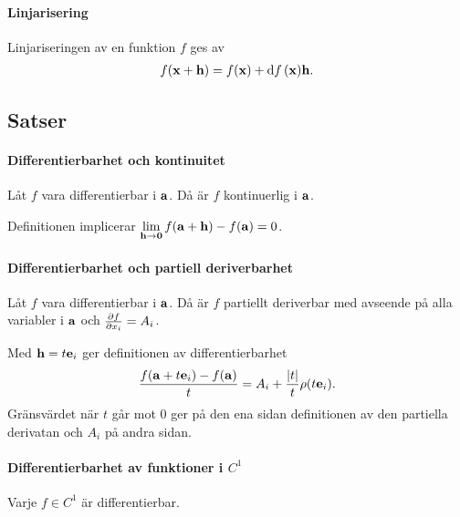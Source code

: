 \paragraph{Linjarisering}
Linjariseringen av en funktion $f$ ges av
\begin{align*}
	f(\vect{x} + \vect{h}) = f(\vect{x}) + \dd{f} (\vect{x})\vect{h}.
\end{align*}

\subsection{Satser}

\paragraph{Differentierbarhet och kontinuitet}
Låt $f$ vara differentierbar i $\vect{a}$. Då är $f$ kontinuerlig i $\vect{a}$.

\proof
Definitionen implicerar $\limit{\vect{h}}{\vect{0}}f(\vect{a} + \vect{h}) - f(\vect{a}) = 0$.

\paragraph{Differentierbarhet och partiell deriverbarhet}
Låt $f$ vara differentierbar i $\vect{a}$. Då är $f$ partiellt deriverbar med avseende på alla variabler i $\vect{a}$ och $\pdv{f}{x_i}(\vect{a}) = A_i$.

\proof
Med $\vect{h} = t\vect{e}_i$ ger definitionen av differentierbarhet
\begin{align*}
	\frac{f(\vect{a} + t\vect{e}_i) - f(\vect{a})}{t} = A_i + \frac{\abs{t}}{t}\rho(t\vect{e}_i).
\end{align*}
Gränsvärdet när $t$ går mot $0$ ger på den ena sidan definitionen av den partiella derivatan och $A_i$ på andra sidan.

\paragraph{Differentierbarhet av funktioner i $C^1$}
Varje $f\in C^1$ är differentierbar.

